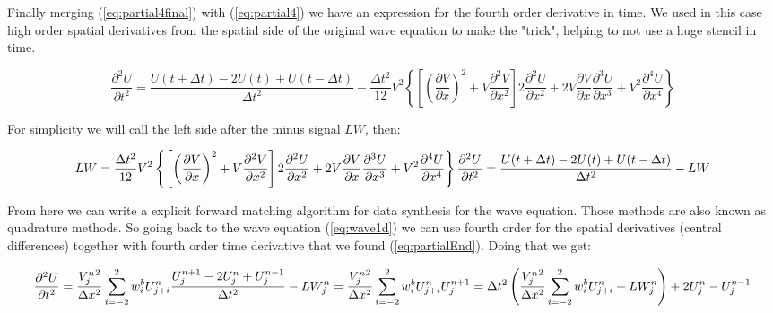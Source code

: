 \documentclass[legalpaper, 12pt]{book}
\begin{document}
Finally merging (\ref{eq:partial4final}) with (\ref{eq:partial4}) we have an expression for the fourth order derivative in time. We used in this case  high order spatial derivatives from the spatial side of the original wave equation to make the "trick", helping to not use a huge stencil in time.

\begin{equation}
\frac{\partial^2 U}{\partial t^2} = \frac{U(t+\Delta t) -2 U(t) + U(t-\Delta t)}{\Delta t^2} - \frac{\Delta t^{2}}{12} V^2 \left\{ \left[ \left(  \frac{\partial V}{\partial x} \right)^2 + V  \frac{\partial^2 V}{\partial x^2} \right] 2 \frac{\partial^2 U}{\partial x^2} + 2 V \frac{\partial V}{\partial x}  \frac{\partial^3 U}{\partial x^3} +  V^2 \frac{\partial^4 U}{\partial x^4}\right\}
\end{equation}

For simplicity we will call the left side after the minus signal $LW$, then:

\begin{equation}
LW = \frac{\Delta t^{2}}{12} V^2 \left\{ \left[ \left(  \frac{\partial V}{\partial x} \right)^2 + V  \frac{\partial^2 V}{\partial x^2} \right] 2 \frac{\partial^2 U}{\partial x^2} + 2 V \frac{\partial V}{\partial x}  \frac{\partial^3 U}{\partial x^3} +  V^2 \frac{\partial^4 U}{\partial x^4}\right\} \\
\frac{\partial^2 U}{\partial t^2} = \frac{U(t+\Delta t) -2 U(t) + U(t-\Delta t)}{\Delta t^2} - LW
\label{eq:partialEnd}
\end{equation}

From here we can write a explicit forward matching algorithm for data synthesis for the wave equation. Those methods are also known as quadrature methods.  So going back to the wave equation (\ref{eq:wave1d}) we can use fourth order for the spatial derivatives (central differences) together with fourth order time derivative that we found (\ref{eq:partialEnd}). Doing that we get:

\begin{equation}
\frac{\partial^2 U}{\partial t^2} = \frac{{V_j^n}^2}{\Delta x^2} \sum_{i=-2}^{2} w_i^b U_{j+i}^n  \\
\frac{U_j^{n+1} -2 U_j^n + U_j^{n-1}}{\Delta t^2} -LW_j^n = \frac{{V_j^n}^2}{\Delta x^2} \sum_{i=-2}^{2} w_i^b U_{j+i}^n \\
U_j^{n+1} = \Delta t^2 \left( \frac{{V_j^n}^2}{\Delta x^2} \sum_{i=-2}^{2} w_i^b U_{j+i}^n +LW_j^n \right) +2 U_j^n - U_j^{n-1}
\end{equation}
\end{document}
